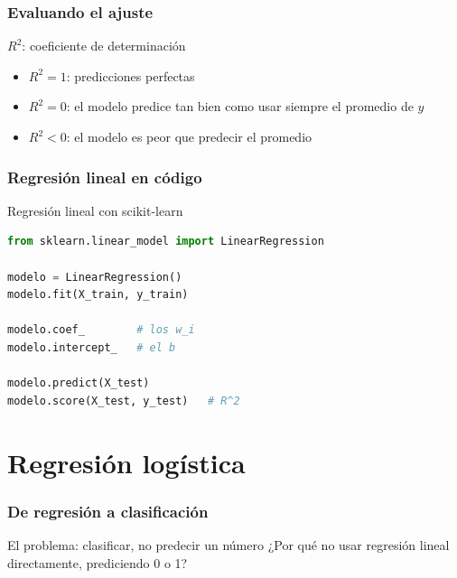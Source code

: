 \section{Evaluando el ajuste}

\begin{frame}{$R^2$: coeficiente de determinación}
  \begin{itemize}
    \item $R^2 = 1$: predicciones perfectas
    \item $R^2 = 0$: el modelo predice tan bien como usar siempre el
      promedio de $y$
    \item $R^2 < 0$: el modelo es peor que predecir el promedio
  \end{itemize}
\end{frame}

\section{Regresión lineal en código}

\begin{frame}[fragile]{Regresión lineal con scikit-learn}
  \begin{lstlisting}[language=Python]
from sklearn.linear_model import LinearRegression

modelo = LinearRegression()
modelo.fit(X_train, y_train)

modelo.coef_        # los w_i
modelo.intercept_   # el b

modelo.predict(X_test)
modelo.score(X_test, y_test)   # R^2
  \end{lstlisting}
\end{frame}

\part{Regresión logística}
\frame{\partpage}

\section{De regresión a clasificación}

\begin{frame}{El problema: clasificar, no predecir un número}
  ¿Por qué no usar regresión lineal directamente, prediciendo 0 o 1?
  \pause
\end{frame}

